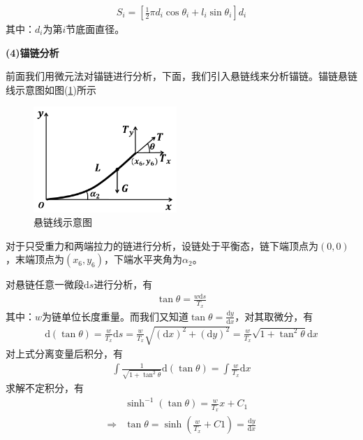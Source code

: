 \documentclass[UTF8]{ctexbook}
\theoremstyle{nonumberplain}
\begin{document}
            \begin{align*}
            S_i = \left[ \frac{1}{2}\pi d_i\cos\theta_i+l_i\sin\theta_i \right]d_i
            \end{align*}
            其中：$d_i$为第$i$节底面直径。
            \par
            \textbf{(4)锚链分析}
            \par
            前面我们用微元法对锚链进行分析，下面，我们引入悬链线来分析锚链。锚链悬链线示意图如图(\ref{悬链线示意图})所示
            \begin{figure}[H]
            \centering
            \includegraphics[height=4cm]{images/Catenary_line.jpg}
            \caption{悬链线示意图}
            \label{悬链线示意图}
            \end{figure}
            对于只受重力和两端拉力的链进行分析，设链处于平衡态，链下端顶点为$(0,0)$，末端顶点为$(x_6,y_6)$，下端水平夹角为$\alpha_2$。
            \par
            对悬链任意一微段$\mathrm{d}s$进行分析，有
            \begin{align*}
            \tan \theta = \frac{w\mathrm{d}s}{T_x}
            \end{align*}
            其中：$w$为链单位长度重量。而我们又知道$\tan\theta = \frac{\mathrm{d}y}{\mathrm{d}x}$，对其取微分，有
            \begin{align*}
            \mathrm{d}(\tan\theta) = \frac{w}{T_x}\mathrm{d}s = \frac{w}{T_x}\sqrt{(\mathrm{d}x)^2+(\mathrm{d}y)^2} = \frac{w}{T_x}\sqrt{1+\tan^2\theta}\mathrm{d}x
            \end{align*}
            对上式分离变量后积分，有
            \begin{align*}
            \int \frac{1}{\sqrt{1+\tan^2\theta}}\mathrm{d}(\tan\theta) = \int
            \frac{w}{T_x}\mathrm{d}x
            \end{align*}
            求解不定积分，有
            \begin{align*}
            & \sinh^{-1}(\tan\theta) = \frac{w}{T_x}x+C_1\\
            \Rightarrow{}& \tan\theta =  \sinh(\frac{w}{T_x}+C1) =\frac{\mathrm{d}y}{\mathrm{d}x}
            \end{align*}
\end{document}
